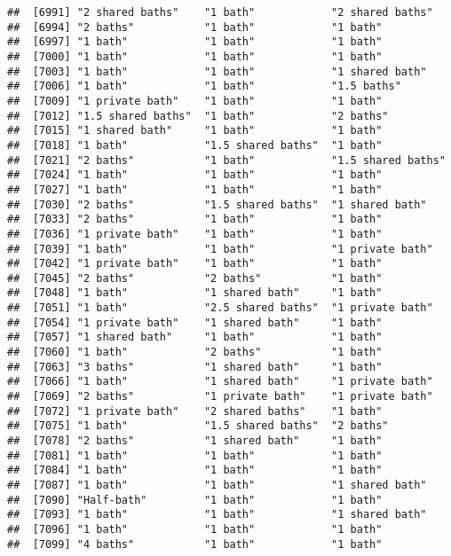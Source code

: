 \documentclass[
]{article}
\begin{document}
\begin{verbatim}
##  [6991] "2 shared baths"    "1 bath"            "2 shared baths"   
##  [6994] "2 baths"           "1 bath"            "1 bath"           
##  [6997] "1 bath"            "1 bath"            "1 bath"           
##  [7000] "1 bath"            "1 bath"            "1 bath"           
##  [7003] "1 bath"            "1 bath"            "1 shared bath"    
##  [7006] "1 bath"            "1 bath"            "1.5 baths"        
##  [7009] "1 private bath"    "1 bath"            "1 bath"           
##  [7012] "1.5 shared baths"  "1 bath"            "2 baths"          
##  [7015] "1 shared bath"     "1 bath"            "1 bath"           
##  [7018] "1 bath"            "1.5 shared baths"  "1 bath"           
##  [7021] "2 baths"           "1 bath"            "1.5 shared baths" 
##  [7024] "1 bath"            "1 bath"            "1 bath"           
##  [7027] "1 bath"            "1 bath"            "1 bath"           
##  [7030] "2 baths"           "1.5 shared baths"  "1 shared bath"    
##  [7033] "2 baths"           "1 bath"            "1 bath"           
##  [7036] "1 private bath"    "1 bath"            "1 bath"           
##  [7039] "1 bath"            "1 bath"            "1 private bath"   
##  [7042] "1 private bath"    "1 bath"            "1 bath"           
##  [7045] "2 baths"           "2 baths"           "1 bath"           
##  [7048] "1 bath"            "1 shared bath"     "1 bath"           
##  [7051] "1 bath"            "2.5 shared baths"  "1 private bath"   
##  [7054] "1 private bath"    "1 shared bath"     "1 bath"           
##  [7057] "1 shared bath"     "1 bath"            "1 bath"           
##  [7060] "1 bath"            "2 baths"           "1 bath"           
##  [7063] "3 baths"           "1 shared bath"     "1 bath"           
##  [7066] "1 bath"            "1 shared bath"     "1 private bath"   
##  [7069] "2 baths"           "1 private bath"    "1 private bath"   
##  [7072] "1 private bath"    "2 shared baths"    "1 bath"           
##  [7075] "1 bath"            "1.5 shared baths"  "2 baths"          
##  [7078] "2 baths"           "1 shared bath"     "1 bath"           
##  [7081] "1 bath"            "1 bath"            "1 bath"           
##  [7084] "1 bath"            "1 bath"            "1 bath"           
##  [7087] "1 bath"            "1 bath"            "1 shared bath"    
##  [7090] "Half-bath"         "1 bath"            "1 bath"           
##  [7093] "1 bath"            "1 bath"            "1 shared bath"    
##  [7096] "1 bath"            "1 bath"            "1 bath"           
##  [7099] "4 baths"           "1 bath"            "1 bath"           

\end{verbatim}
\end{document}
